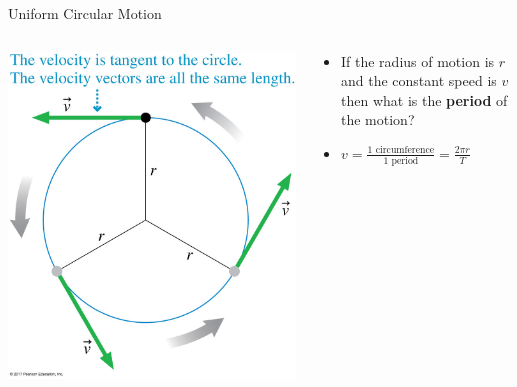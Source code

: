 \documentclass{beamer}
\begin{document}
\begin{frame}{Uniform Circular Motion}
\begin{columns}
\begin{column}{0.4\textwidth}
   \begin{center}
      \includegraphics[width=\textwidth]{../figures/04_21_Figure.jpg}
   \end{center}
\end{column}
\begin{column}{0.6\textwidth}
   \begin{itemize}
      \item If the radius of motion is $r$ and the constant speed is $v$ then what is the {\bf period} of the motion?
      \item<2-> $v=\frac{1 \text{ circumference}}{1 \text{ period}} = \frac{2\pi r}{T}$
   \end{itemize}
\end{column}
\end{columns}
\end{frame}
\end{document}

